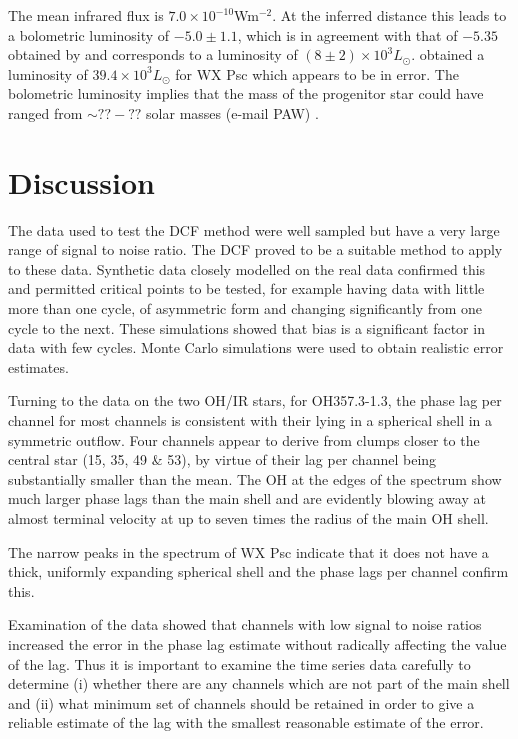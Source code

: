 \documentclass[usenatbib,usegraphicx]{mn2e}
\begin{document}
The mean infrared flux is $7.0\times10^{-10}$Wm$^{-2}$.  At the inferred
distance this leads to a bolometric luminosity of $-5.0\pm1.1$, which is in
agreement with that of $-5.35$ obtained by \citet{OliWhtlkMar01} and
corresponds to a luminosity of $(8\pm2)\times 10^3 L_\odot$. 
\citet{vLvdHvS90} obtained a luminosity of $39.4\times 10^3 L_\odot$ for WX
Psc which appears to be in error.  The bolometric luminosity implies that
the mass of the progenitor star could have ranged from $\sim??-??$ solar
masses (e-mail PAW) \citep{IbenRen83}.


\section{Discussion}

The data used to test the DCF method were well sampled but have a very large
range of signal to noise ratio.  The DCF proved to be a suitable method to
apply to these data.  Synthetic data closely modelled on the real data
confirmed this and permitted critical points to be tested, for example
having data with little more than one cycle, of asymmetric form and changing
significantly from one cycle to the next.  These simulations showed that
bias is a significant factor in data with few cycles.  Monte Carlo
simulations were used to obtain realistic error estimates.

Turning to the data on the two OH/IR stars, for OH357.3-1.3, the phase lag
per channel for most channels is consistent with their lying in a spherical
shell in a symmetric outflow.  Four channels appear to derive from clumps
closer to the central star (15, 35, 49 \& 53), by virtue of their lag per
channel being substantially smaller than the mean.  The OH at the edges of
the spectrum show much larger phase lags than the main shell and are
evidently blowing away at almost terminal velocity at up to seven times the
radius of the main OH shell.

The narrow peaks in the spectrum of WX Psc indicate that it does not have a
thick, uniformly expanding spherical shell and the phase lags per channel
confirm this.

Examination of the data showed that channels with low signal to noise ratios
increased the error in the phase lag estimate without radically affecting
the value of the lag.  Thus it is important to examine the time series data
carefully to determine (i) whether there are any channels which are not part
of the main shell and (ii) what minimum set of channels should be retained
in order to give a reliable estimate of the lag with the smallest reasonable
estimate of the error.
\end{document}
